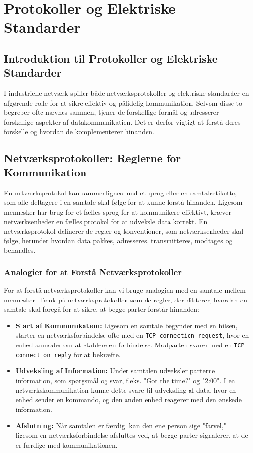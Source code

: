 \chapter{Protokoller og Elektriske Standarder}

\section{Introduktion til Protokoller og Elektriske Standarder}
I industrielle netværk spiller både netværksprotokoller og elektriske standarder en afgørende rolle for at sikre effektiv og pålidelig kommunikation. Selvom disse to begreber ofte nævnes sammen, tjener de forskellige formål og adresserer forskellige aspekter af datakommunikation. Det er derfor vigtigt at forstå deres forskelle og hvordan de komplementerer hinanden.

\section{Netværksprotokoller: Reglerne for Kommunikation}
En netværksprotokol kan sammenlignes med et sprog eller en samtaleetikette, som alle deltagere i en samtale skal følge for at kunne forstå hinanden. Ligesom mennesker har brug for et fælles sprog for at kommunikere effektivt, kræver netværksenheder en fælles protokol for at udveksle data korrekt. En netværksprotokol definerer de regler og konventioner, som netværksenheder skal følge, herunder hvordan data pakkes, adresseres, transmitteres, modtages og behandles.

\subsection{Analogier for at Forstå Netværksprotokoller}
For at forstå netværksprotokoller kan vi bruge analogien med en samtale mellem mennesker. Tænk på netværksprotokollen som de regler, der dikterer, hvordan en samtale skal foregå for at sikre, at begge parter forstår hinanden:

\begin{itemize}
	\item \textbf{Start af Kommunikation:} Ligesom en samtale begynder med en hilsen, starter en netværksforbindelse ofte med en \texttt{TCP connection request}, hvor en enhed anmoder om at etablere en forbindelse. Modparten svarer med en \texttt{TCP connection reply} for at bekræfte.
	\item \textbf{Udveksling af Information:} Under samtalen udveksler parterne information, som spørgsmål og svar, f.eks. "Got the time?" og "2:00". I en netværkskommunikation kunne dette svare til udveksling af data, hvor en enhed sender en kommando, og den anden enhed reagerer med den ønskede information.
	\item \textbf{Afslutning:} Når samtalen er færdig, kan den ene person sige "farvel," ligesom en netværksforbindelse afsluttes ved, at begge parter signalerer, at de er færdige med kommunikationen.
\end{itemize}

